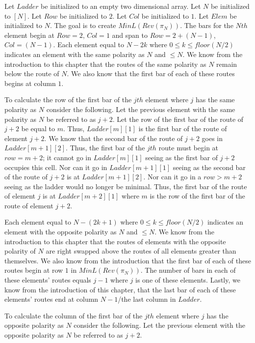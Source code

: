 Let $Ladder$ be initialized to an empty two dimensional array. Let $N$ be initialized to $[N]$. Let $Row$ be initialized to 
$2$. Let $Col$ be initialized to $1$. Let $Elem$ be initialized to $N$. The goal is to create $MinL(Rev(\pi_{N}))$.
The bars for the $Nth$ element begin at $Row=2$, 
$Col=1$ and span to $Row=2+(N-1)$, $Col=(N-1)$. Each element equal to $N-2k$ where $0 \leq k \leq floor(N/2)$ indicates an element with the 
same polarity as $N$ and $\leq N$. We know from the introduction to this chapter that the routes of the same polarity as $N$ remain 
below the route of $N$. We also know that the first bar of each of these routes begins at column $1$.\par 
To calculate the row of the first bar of the $jth$ element where $j$ has the 
same polarity as $N$ consider the following. Let the previous element with the same polarity as $N$ be referred to as $j+2$.
Let the row of the first bar of the route of $j+2$ be equal to $m$. Thus, $Ladder[m][1]$ is the first bar 
of the route of element $j+2$. We know that the second bar of the route of $j+2$ goes in $Ladder[m+1][2]$. Thus, the 
first bar of the $jth$ route must begin at $row=m+2$; it cannot go in $Ladder[m][1]$ seeing as the first bar 
of $j+2$ occupies this cell. Nor can it go in $Ladder[m+1][1]$ seeing as the second bar of the route of $j+2$ 
is at $Ladder[m+1][2]$. Nor can it go in a $row > m+2$ seeing as the ladder would no longer be minimal. Thus, 
the first bar of the route of element $j$ is at $Ladder[m+2][1]$ where $m$ is the row of the first bar of the route 
of element $j+2$.\par 
Each element equal to $N-(2k+1)$  where $0 \leq k \leq floor(N/2)$ indicates an element with the opposite polarity as $N$ and $\leq N$. We know 
from the introduction to this chapter that the routes of elements with the opposite polarity of $N$ are right swapped above the routes 
of all elements greater than themselves. We also know from the introduction that the first 
bar of each of these routes begin at row $1$ in $MinL(Rev(\pi_{N}))$. The number of bars in each of these elements' 
routes equals $j-1$ where $j$ is one of these elements. Lastly, we know from the introduction of this chapter, that the last 
bar of each of these elements' routes end at column $N-1$/the last column in $Ladder$.\par 
To calculate the column of the first bar of the $jth$ element where $j$ has the opposite polarity 
as $N$ consider the following. Let the previous element with the opposite polarity as $N$ be referred to as $j+2$. 
